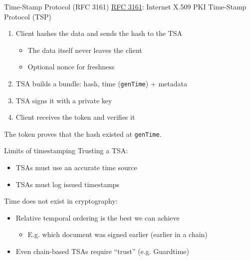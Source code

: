 \begin{frame}{Time-Stamp Protocol (RFC 3161)}
  \href{https://datatracker.ietf.org/doc/html/rfc3161}{RFC 3161}: Internet X.509 PKI Time-Stamp Protocol (TSP)
  \begin{enumerate}[<+(1)->]
    \item Client hashes the data and sends the hash to the TSA
    \begin{itemize}
      \item The data itself never leaves the client
      \item Optional nonce for freshness
    \end{itemize}
    \item TSA builds a bundle: hash, time (\texttt{genTime}) + metadata
    \item TSA signs it with a private key
    \item Client receives the token and verifies it
  \end{enumerate}

  \pause
  The token proves that the hash existed at \texttt{genTime}.
\end{frame}

\begin{frame}{Limits of timestamping}
  \pause
  Trusting a TSA:
  \begin{itemize}[<+(1)->]
    \item TSAs must use an accurate time source
    \item TSAs must log issued timestamps
  \end{itemize}

  \vspace*{0.5em}

  \pause
  Time does not exist in cryptography:
  \begin{itemize}[<+(1)->]
    \item Relative temporal ordering is the best we can achieve
    \begin{itemize}
      \item E.g. which document was signed earlier (earlier in a chain)
    \end{itemize}
    \item Even chain-based TSAs require \enquote{trust} (e.g. Guardtime)
  \end{itemize}
\end{frame}

